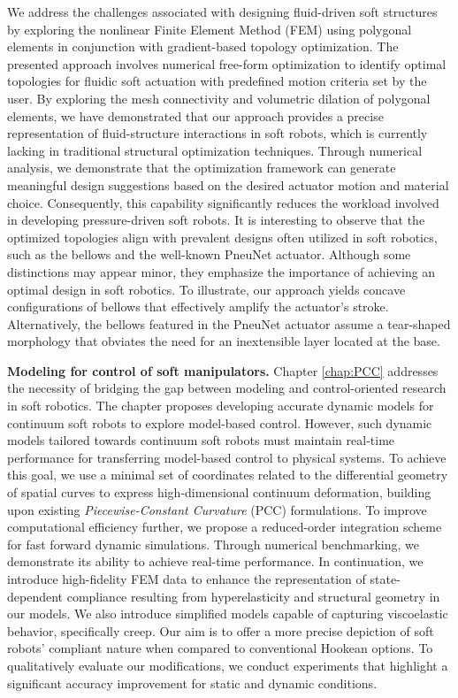 We address the challenges associated with designing fluid-driven soft structures by exploring the nonlinear Finite Element Method (FEM) using polygonal elements in conjunction with gradient-based topology optimization. The presented approach involves numerical free-form optimization to identify optimal topologies for fluidic soft actuation with predefined motion criteria set by the user. By exploring the mesh connectivity and volumetric dilation of polygonal elements, we have demonstrated that our approach provides a precise representation of fluid-structure interactions in soft robots, which is currently lacking in traditional structural optimization techniques. Through numerical analysis, we demonstrate that the optimization framework can generate meaningful design suggestions based on the desired actuator motion and material choice. Consequently, this capability significantly reduces the workload involved in developing pressure-driven soft robots. It is interesting to observe that the optimized topologies align with prevalent designs often utilized in soft robotics, such as the bellows and the well-known PneuNet actuator. Although some distinctions may appear minor, they emphasize the importance of achieving an optimal design in soft robotics. To illustrate, our approach yields concave configurations of bellows that effectively amplify the actuator's stroke. Alternatively, the bellows featured in the PneuNet actuator assume a tear-shaped morphology that obviates the need for an inextensible layer located at the base. \vspace{1mm}

\textbf{Modeling for control of soft manipulators.} Chapter \ref{chap:PCC} addresses the necessity of bridging the gap between modeling and control-oriented research in soft robotics. The chapter proposes developing accurate dynamic models for continuum soft robots to explore model-based control. However, such dynamic models tailored towards continuum soft robots must maintain real-time performance for transferring model-based control to physical systems. To achieve this goal, we use a minimal set of coordinates related to the differential geometry of spatial curves to express high-dimensional continuum deformation, building upon existing \textit{Piecewise-Constant Curvature} (PCC) formulations. To improve computational efficiency further, we propose a reduced-order integration scheme for fast forward dynamic simulations. Through numerical benchmarking, we demonstrate its ability to achieve real-time performance. In continuation, we introduce high-fidelity FEM data to enhance the representation of state-dependent compliance resulting from hyperelasticity and structural geometry in our models. We also introduce simplified models capable of capturing viscoelastic behavior, specifically creep. Our aim is to offer a more precise depiction of soft robots' compliant nature when compared to conventional Hookean options. To qualitatively evaluate our modifications, we conduct experiments that highlight a significant accuracy improvement for static and dynamic conditions.

